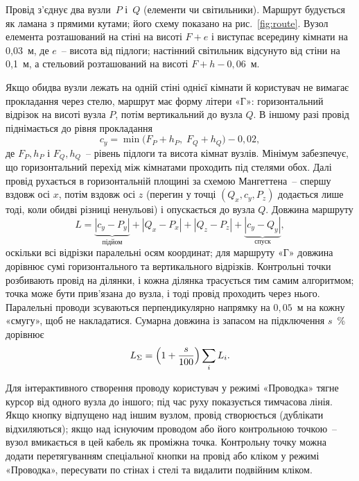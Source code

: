 
Провід з'єднує два вузли~$P$ і~$Q$ (елементи чи світильники). Маршрут будується як ламана з прямими кутами; його схему показано на рис.~\ref{fig:route}. Вузол елемента розташований на стіні на висоті $F+e$ і виступає всередину кімнати на 0,03~м, де $e$~-- висота від підлоги; настінний світильник відсунуто від стіни на 0,1~м, а стельовий розташований на висоті $F+h-0{,}06$~м.


Якщо обидва вузли лежать на одній стіні однієї кімнати й користувач не вимагає прокладання через стелю, маршрут має форму літери «Г»: горизонтальний відрізок на висоті вузла $P$, потім вертикальний до вузла $Q$. В іншому разі провід піднімається до рівня прокладання
\begin{equation}\label{eq:cy}
    c_y = \min\bigl(F_P+h_P,\; F_Q+h_Q\bigr) - 0{,}02,
\end{equation}
де $F_P, h_P$ і $F_Q, h_Q$~-- рівень підлоги та висота кімнат вузлів. Мінімум забезпечує, що горизонтальний перехід між кімнатами проходить під стелями обох. Далі провід рухається в горизонтальній площині за схемою Мангеттена~-- спершу вздовж осі $x$, потім вздовж осі $z$ (перегин у точці $(Q_x,c_y,P_z)$ додається лише тоді, коли обидві різниці ненульові) і опускається до вузла $Q$. Довжина маршруту
\begin{equation}\label{eq:wirelen}
    L = \underbrace{|c_y-P_y|}_{\text{підйом}} + |Q_x-P_x| + |Q_z-P_z| + \underbrace{|c_y-Q_y|}_{\text{спуск}},
\end{equation}
оскільки всі відрізки паралельні осям координат; для маршруту «Г» довжина дорівнює сумі горизонтального та вертикального відрізків. Контрольні точки розбивають провід на ділянки, і кожна ділянка трасується тим самим алгоритмом; точка може бути прив'язана до вузла, і тоді провід проходить через нього. Паралельні проводи зсуваються перпендикулярно напрямку на $0{,}05$~м на кожну «смугу», щоб не накладатися. Сумарна довжина із запасом на підключення $s$~\% дорівнює
\begin{equation}\label{eq:wiretotal}
    L_\Sigma = \Bigl(1+\frac{s}{100}\Bigr)\sum_i L_i .
\end{equation}

Для інтерактивного створення проводу користувач у режимі «Проводка» тягне курсор від одного вузла до іншого; під час руху показується тимчасова лінія. Якщо кнопку відпущено над іншим вузлом, провід створюється (дублікати відхиляються); якщо над існуючим проводом або його контрольною точкою~-- вузол вмикається в цей кабель як проміжна точка. Контрольну точку можна додати перетягуванням спеціальної кнопки на провід або кліком у режимі «Проводка», пересувати по стінах і стелі та видалити подвійним кліком.

